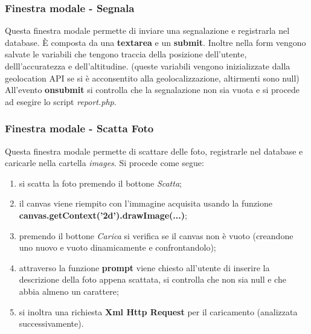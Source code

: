\subsubsection{Finestra modale - Segnala}
Questa finestra modale permette di inviare una segnalazione e registrarla nel database. È composta da una \textbf{textarea} e un \textbf{submit}. Inoltre nella form vengono salvate le variabili che tengono traccia della posizione dell'utente, delll'accuratezza e dell'altitudine. (queste variabili vengono inizializzate dalla geolocation API se si è acconsentito alla geolocalizzazione, altirmenti sono null) \newline All'evento \textbf{onsubmit} si controlla che la segnalazione non sia vuota e si procede ad esegire lo script \textit{report.php}.

\subsubsection{Finestra modale - Scatta Foto}
Questa finestra modale permette di scattare delle foto, registrarle nel database e caricarle nella cartella \textit{images}.
Si procede come segue:
\begin{enumerate}
\item si scatta la foto premendo il bottone \textit{Scatta};
\item il canvas viene riempito con l'immagine acquisita usando la funzione \newline \textbf{canvas.getContext('2d').drawImage(...)};
\item premendo il bottone \textit{Carica} si verifica se il canvas non è vuoto (creandone uno nuovo e vuoto dinamicamente e confrontandolo);
\item attraverso la funzione \textbf{prompt} viene chiesto all'utente di inserire la descrizione della foto appena scattata, si controlla che non sia null e che abbia almeno un carattere;
\item si inoltra una richiesta \textbf{Xml Http Request} per il caricamento (analizzata successivamente).
\end{enumerate}

